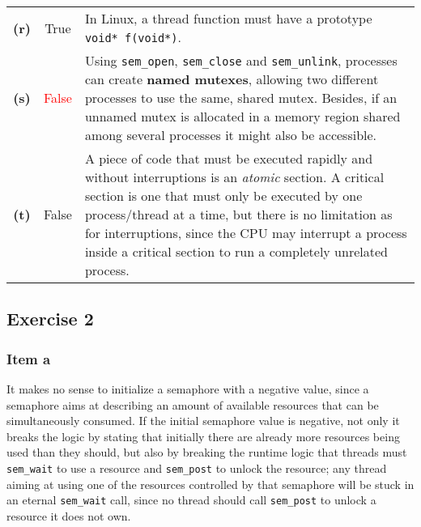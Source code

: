 {\begin{center}
\begin{longtable}{c | c p{132mm}}
        \textbf{(r)} & True & In Linux, a thread function must have a prototype \texttt{void* f(void*)}. \\
        \textbf{(s)} & \textcolor{red}{False} & Using \texttt{sem\_open}, \texttt{sem\_close} and \texttt{sem\_unlink}, processes can create \textbf{named mutexes}, allowing two different processes to use the same, shared mutex. Besides, if an unnamed mutex is allocated in a memory region shared among several processes it might also be accessible. \\
        \textbf{(t)} & False & A piece of code that must be executed rapidly and without interruptions is an \emph{atomic} section. A critical section is one that must only be executed by one process/thread at a time, but there is no limitation as for interruptions, since the CPU may interrupt a process inside a critical section to run a completely unrelated process.
    \end{longtable}
\end{center}
\subsection{Exercise 2}

\subsubsection{Item a}
It makes no sense to initialize a semaphore with a negative value, since a semaphore aims at describing an amount of available resources that can be simultaneously consumed. If the initial semaphore value is negative, not only it breaks the logic by stating that initially there are already more resources being used than they should, but also by breaking the runtime logic that threads must \texttt{sem\_wait} to use a resource and \texttt{sem\_post} to unlock the resource; any thread aiming at using one of the resources controlled by that semaphore will be stuck in an eternal \texttt{sem\_wait} call, since no thread should call \texttt{sem\_post} to unlock a resource it does not own.

}
